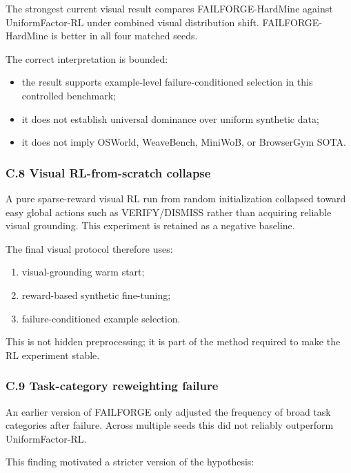 \documentclass[
]{article}
\providecommand{\tightlist}{%
  \setlength{\itemsep}{0pt}\setlength{\parskip}{0pt}}
\begin{document}
The strongest current visual result compares FAILFORGE-HardMine against
UniformFactor-RL under combined visual distribution shift.
FAILFORGE-HardMine is better in all four matched seeds.

The correct interpretation is bounded:

\begin{itemize}
\tightlist
\item
  the result supports example-level failure-conditioned selection in
  this controlled benchmark;
\item
  it does not establish universal dominance over uniform synthetic data;
\item
  it does not imply OSWorld, WeaveBench, MiniWoB, or BrowserGym SOTA.
\end{itemize}

\subsubsection{C.8 Visual RL-from-scratch
collapse}\label{c.8-visual-rl-from-scratch-collapse}

A pure sparse-reward visual RL run from random initialization collapsed
toward easy global actions such as VERIFY/DISMISS rather than acquiring
reliable visual grounding. This experiment is retained as a negative
baseline.

The final visual protocol therefore uses:

\begin{enumerate}
\def\labelenumi{\arabic{enumi}.}
\tightlist
\item
  visual-grounding warm start;
\item
  reward-based synthetic fine-tuning;
\item
  failure-conditioned example selection.
\end{enumerate}

This is not hidden preprocessing; it is part of the method required to
make the RL experiment stable.

\subsubsection{C.9 Task-category reweighting
failure}\label{c.9-task-category-reweighting-failure}

An earlier version of FAILFORGE only adjusted the frequency of broad
task categories after failure. Across multiple seeds this did not
reliably outperform UniformFactor-RL.

This finding motivated a stricter version of the hypothesis:
\end{document}
